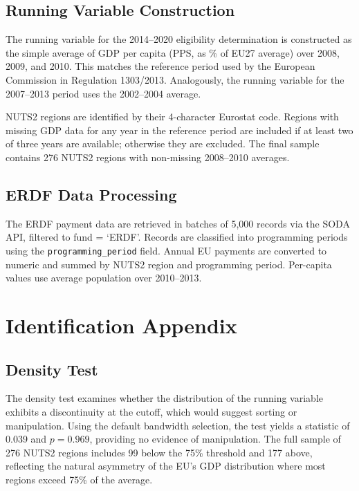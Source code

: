\documentclass[12pt]{article}
\begin{document}
\subsection{Running Variable Construction}

The running variable for the 2014--2020 eligibility determination is constructed as the simple average of GDP per capita (PPS, as \% of EU27 average) over 2008, 2009, and 2010. This matches the reference period used by the European Commission in Regulation 1303/2013. Analogously, the running variable for the 2007--2013 period uses the 2002--2004 average.

NUTS2 regions are identified by their 4-character Eurostat code. Regions with missing GDP data for any year in the reference period are included if at least two of three years are available; otherwise they are excluded. The final sample contains 276 NUTS2 regions with non-missing 2008--2010 averages.

\subsection{ERDF Data Processing}

The ERDF payment data are retrieved in batches of 5,000 records via the SODA API, filtered to fund = `ERDF'. Records are classified into programming periods using the \texttt{programming\_period} field. Annual EU payments are converted to numeric and summed by NUTS2 region and programming period. Per-capita values use average population over 2010--2013.

\section{Identification Appendix}
\label{sec:appendix_id}

\subsection{Density Test}

The \citet{CattaneoJanssonMa2020} density test examines whether the distribution of the running variable exhibits a discontinuity at the cutoff, which would suggest sorting or manipulation. Using the default bandwidth selection, the test yields a statistic of 0.039 and $p = 0.969$, providing no evidence of manipulation. The full sample of 276 NUTS2 regions includes 99 below the 75\% threshold and 177 above, reflecting the natural asymmetry of the EU's GDP distribution where most regions exceed 75\% of the average.
\end{document}
